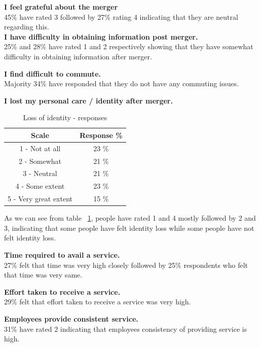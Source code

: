 \documentclass[a4paper, 12pt]{extarticle}
\begin{document}
{\textbf{ I feel grateful about the merger}  \\
 45\% have rated 3 followed by 27\% rating 4 indicating that they are neutral regarding this.\\

\textbf{ I have difficulty in obtaining information post merger. } \\
25\% and 28\% have rated 1 and 2 respectively showing that they have somewhat difficulty in obtaining information after merger.\\

\par \textbf{ I find difficult to commute.} \\
 Majority 34\% have responded that they do not have any commuting issues.    

\par \textbf{ I lost my personal care / identity after merger. }  \\
\begin{table}[H]
\centering
\begin{tabular}{|c|c|}
\hline
Scale & Response \% \\
\hline
1 - Not at all & 23 \% \\
\hline
2 - Somewhat & 21 \% \\
\hline
3 - Neutral & 21 \% \\
\hline
4 - Some extent & 23 \% \\
\hline
5 - Very great extent & 15 \% \\
\hline
\end{tabular}
\caption{Loss of identity - responses}
\label{table:identity_loss}
\end{table}
As we can see from table ~\ref{table:identity_loss}, people have rated 1 and 4 mostly followed by 2 and 3, indicating that some people have felt identity loss while some people have not felt identity loss. \\
\newpage
\par \textbf{ Time required to avail a service.} \\
27\% felt that time was very high closely followed by 25\% respondents who felt that time was very same.\\

\par \textbf{ Effort taken to receive a service.} \\ 
29\% felt that effort taken to receive a service was very high.\\

\par \textbf{ Employees provide consistent service.} \\  
31\% have rated 2 indicating that employees consistency of providing service is high. \\

}
\end{document}
